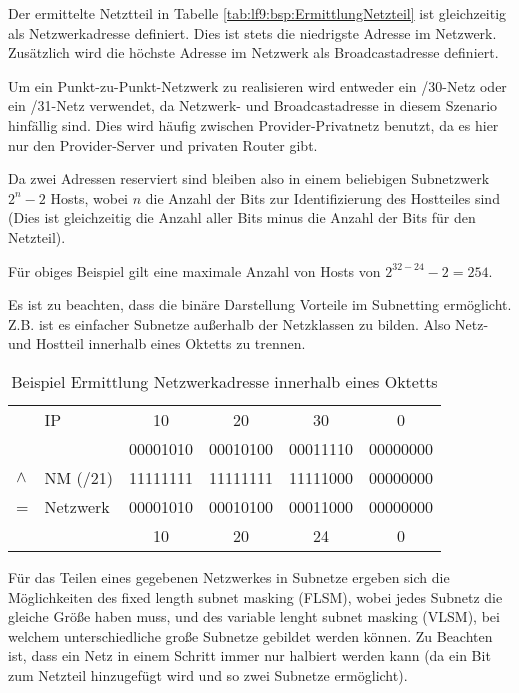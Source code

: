 Der ermittelte Netztteil in Tabelle \ref{tab:lf9:bsp:ErmittlungNetzteil} ist gleichzeitig als Netzwerkadresse definiert. Dies ist stets die niedrigste Adresse im Netzwerk. Zusätzlich wird die höchste Adresse im Netzwerk als Broadcastadresse definiert.

Um ein Punkt-zu-Punkt-Netzwerk zu realisieren wird entweder ein /30-Netz oder ein /31-Netz verwendet, da Netzwerk- und Broadcastadresse in diesem Szenario hinfällig sind. Dies wird häufig zwischen Provider-Privatnetz benutzt, da es hier nur den Provider-Server und privaten Router gibt.

Da zwei Adressen reserviert sind bleiben also in einem beliebigen Subnetzwerk $2^{n} - 2$ Hosts, wobei $n$ die Anzahl der Bits zur Identifizierung des Hostteiles sind (Dies ist gleichzeitig die Anzahl aller Bits minus die Anzahl der Bits für den Netzteil).

Für obiges Beispiel gilt eine maximale Anzahl von Hosts von $2^{32 - 24} - 2 = 254$.

Es ist zu beachten, dass die binäre Darstellung Vorteile im Subnetting ermöglicht. Z.B. ist es einfacher Subnetze außerhalb der Netzklassen zu bilden. Also Netz- und Hostteil innerhalb eines Oktetts zu trennen.

\begin{table}
    [H]
    \centering
    \begin{tabular}{|l|l|cccc|}
        \hline
                & IP       & 10       & 20       & 30       & 0        \\\cline{3-6}
                &          & 00001010 & 00010100 & 00011110 & 00000000 \\\hline
        $\land$ & NM (/21) & 11111111 & 11111111 & 11111000 & 00000000 \\\hline
        =       & Netzwerk & 00001010 & 00010100 & 00011000 & 00000000 \\\cline{3-6}
                &          & 10       & 20       & 24       & 0        \\\hline
    \end{tabular}
    \caption{Beispiel Ermittlung Netzwerkadresse innerhalb eines Oktetts}
\end{table}

Für das Teilen eines gegebenen Netzwerkes in Subnetze ergeben sich die Möglichkeiten des fixed length subnet masking (FLSM), wobei jedes Subnetz die gleiche Größe haben muss, und des variable lenght subnet masking (VLSM), bei welchem unterschiedliche große Subnetze gebildet werden können. Zu Beachten ist, dass ein Netz in einem Schritt immer nur halbiert werden kann (da ein Bit zum Netzteil hinzugefügt wird und so zwei Subnetze ermöglicht).

